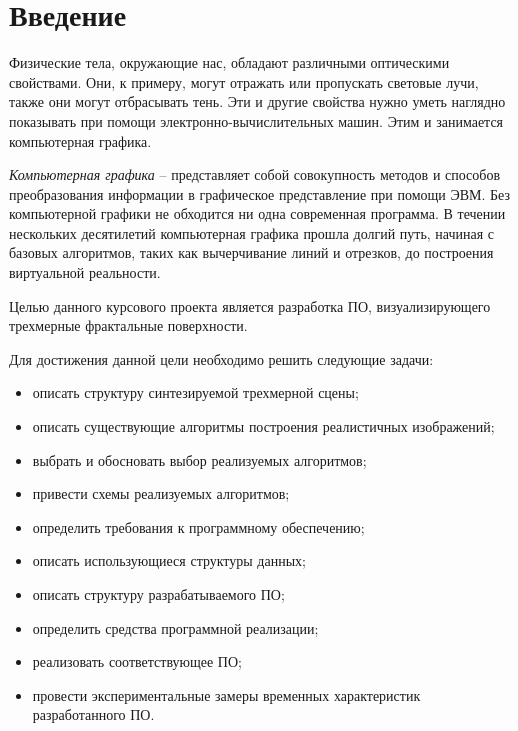 \chapter*{Введение}

Физические тела, окружающие нас, обладают различными оптическими свойствами. Они, к примеру, могут отражать или пропускать световые лучи, также они могут отбрасывать тень. Эти и другие свойства нужно уметь наглядно показывать при помощи электронно-вычислительных машин.
Этим и занимается компьютерная графика.

\textit{Компьютерная графика} -- представляет собой совокупность методов и способов преобразования информации в графическое представление при помощи ЭВМ.
Без компьютерной графики не обходится ни одна современная программа. В течении нескольких десятилетий компьютерная графика прошла долгий путь, начиная с базовых
алгоритмов, таких как вычерчивание линий и отрезков, до построения виртуальной реальности.

Целью данного курсового проекта является разработка ПО, визуализирующего трехмерные
фрактальные поверхности.

Для достижения данной цели необходимо решить следующие задачи:

\begin{itemize}
    \item описать структуру синтезируемой трехмерной сцены;
    \item описать существующие алгоритмы построения реалистичных изображений;
    \item выбрать и обосновать выбор реализуемых алгоритмов;
    \item привести схемы реализуемых алгоритмов;
    \item определить требования к программному обеспечению;
	\item описать использующиеся структуры данных;
	\item описать структуру разрабатываемого ПО;
	\item определить средства программной реализации;
    \item реализовать соответствующее ПО;
	\item провести экспериментальные замеры временных характеристик разработанного ПО.
\end{itemize}
